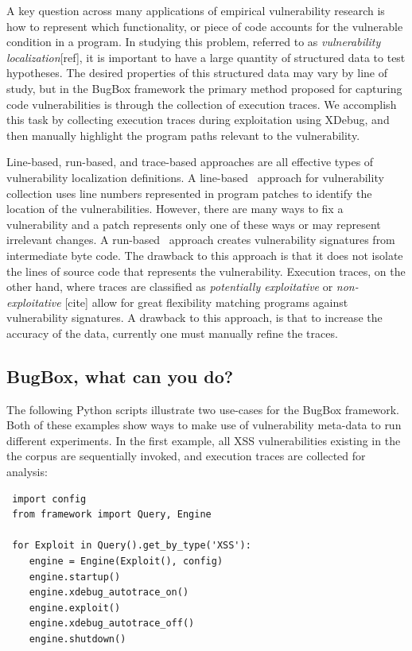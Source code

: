 \documentclass[letterpaper,twocolumn,10pt]{article}
\begin{document}
A key question across many applications of empirical vulnerability research is how to represent which functionality, or piece of code accounts for the vulnerable condition in a program. In studying this problem, referred to as \emph{vulnerability localization}[ref], it is important to have a large quantity of structured data to test hypotheses. The desired properties of this structured data may vary by line of study, but in the BugBox framework the primary method proposed for capturing code vulnerabilities is through the collection of execution traces. We accomplish this task by collecting execution traces during exploitation using XDebug, and then manually highlight the program paths relevant to the vulnerability.\par 
Line-based, run-based, and trace-based approaches are all effective types of vulnerability localization definitions. A line-based~\cite{4630094} approach for vulnerability collection uses line numbers represented in program patches to identify the location of the vulnerabilities.  However, there are many ways to fix a vulnerability and a patch represents only one of these ways or may represent irrelevant changes.  A run-based~\cite{Song:2008:BNA:1496255.1496257} approach creates vulnerability signatures from intermediate byte code. The drawback to this approach is that it does not isolate the lines of source code that represents the vulnerability. Execution traces, on the other hand, where traces are classified as \emph{potentially exploitative} or \emph{non-exploitative} [cite] allow for great flexibility matching programs against vulnerability signatures. A drawback to this approach, is that to increase the accuracy of the data, currently one must manually refine the traces.   

\subsection{BugBox, what can you do?}

The following Python scripts illustrate two use-cases for the BugBox framework. Both of these examples show ways to make use of vulnerability meta-data to run different experiments. In the first example, all XSS vulnerabilities existing in the the corpus are sequentially invoked, and execution traces are collected for analysis:

\begin{minipage}{\textwidth}
{\tt \footnotesize

\begin{lstlisting}
 import config
 from framework import Query, Engine
 
 for Exploit in Query().get_by_type('XSS'):
    engine = Engine(Exploit(), config)
    engine.startup()
    engine.xdebug_autotrace_on()
    engine.exploit()
    engine.xdebug_autotrace_off()
    engine.shutdown()
\end{lstlisting}
}
\end{minipage}
\end{document}
